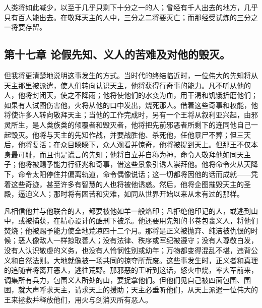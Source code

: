 \par

人类将如此减少，以至于几乎只剩下十分之一的人；曾经有千人出去的地方，几乎只有百人能出去。在敬拜天主的人中，三分之二将要灭亡；而那经受试炼的三分之一将要存留。\par


\subsection{第十七章 论假先知、义人的苦难及对他的毁灭。}

但我将更清楚地说明这事发生的方式。当时代的终结临近时，一位伟大的先知将从天主那里被派遣，使人们转向认识天主，他将获得行奇事的能力。凡不听从他的人，他将封闭天，使之不降雨；他将使他们的水变为血，用干渴和饥饿折磨他们；如果有人试图伤害他，火将从他的口中发出，烧死那人。借着这些奇事和权能，他将使许多人转向敬拜天主；当他的工作完成时，另有一个王将从叙利亚兴起，由邪灵所生，是人类族类的倾覆者和毁灭者，他将把先前邪恶者所剩下的连同他自己一起毁灭。他将与天主的先知作战，并要战胜他、杀死他，任他暴尸不葬；但三天后，他将复活；在众目睽睽下，众人观看并惊奇，他将被提到天上。但那王不仅本身最可耻，而且也是谎言的先知；他将自立并自称为神，命令人敬拜他如同天主子；他将被赐予能力行征兆和奇事，借这些景象引诱人崇拜他。他将命令火从天降下，命令太阳停住并偏离轨道，命令偶像说话；这一切都将因他的话而成就——凭着这些奇迹，甚至许多有智慧的人也将被他诱惑。然后，他将企图摧毁天主的圣殿，逼迫义人；那时将有困苦和灾难，如同从世界开始以来从未有过的那样。\par

凡相信他并与他联合的人，都要被他如羊一般烙印；凡拒绝他印记的人，或逃到山中，或被捕获，在精心设计的酷刑下被杀。他还要用先知的书卷包裹义人，将他们焚烧；他被赐予能力使全地荒凉四十二个月。那将是正义被抛弃、纯洁被仇恨的时候；恶人像敌人一样掠取善人；没有法律、秩序或军纪被遵守；没有人尊敬白发，没有人认识敬虔的义务，也没有人怜悯性别或幼年；万物都变得混乱不堪，违背公义和自然法则。大地就像被一场共同的掠夺所荒废。这些事发生时，正义者和真理的追随者将离开恶人，逃往荒野。那邪恶的王听到这话，怒火中烧，率大军前来，调集所有兵力，包围义人所处的山，要捉拿他们。但他们见自己被四面包围、围困，就大声呼求天主，请求天上的援助；天主必垂听他们，从天上派遣一位伟大的王来拯救并释放他们，用火与剑消灭所有恶人。\par


